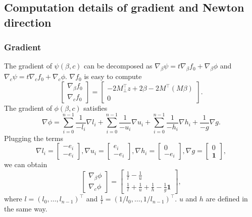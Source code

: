 \documentclass[final,onefignum,onetabnum]{siamart190516}
\begin{document}
\subsection{Computation details of gradient and Newton direction}
\subsubsection{Gradient}
The gradient of $\psi(\beta,c)$ can be decomposed as $\nabla_{\beta}\psi = t\nabla_{\beta} f_0 + \nabla_{\beta}\phi$ and $\nabla_{c}\psi = t\nabla_{c} f_0 + \nabla_{c}\phi$. $\nabla f_0$ is easy to compute
\begin{equation}
    \begin{bmatrix}
    \nabla_{\beta} f_0\\
    \nabla_{c} f_0
    \end{bmatrix} = \begin{bmatrix}-2M_{\perp}^\top z + 2\beta - 2 M^\top (M\beta)\\ 0\end{bmatrix}.
\end{equation}
The gradient of $\phi(\beta,c)$ satisfies
\begin{equation}
    \nabla \phi = \sum_{i=0}^{n-1}\frac{1}{-l_i}\nabla l_i + \sum_{i=0}^{n-1}\frac{1}{-u_i}\nabla u_i + \sum_{i=0}^{n-1}\frac{1}{-h_i}\nabla h_i + \frac{1}{-g}\nabla g.
\end{equation}
Plugging the terms
\begin{equation}
     \nabla l_i = \begin{bmatrix}-e_i\\-e_i\end{bmatrix}, 
    \nabla u_i = \begin{bmatrix}e_i\\-e_i\end{bmatrix},
    \nabla h_i = \begin{bmatrix}0\\-e_i\end{bmatrix},
    \nabla g = \begin{bmatrix}0\\\mathbf{1}\end{bmatrix},
\end{equation}
we can obtain
\begin{equation}
    \begin{bmatrix}
    \nabla_{\beta}\phi\\
    \nabla_{c}\phi
    \end{bmatrix} = \begin{bmatrix} \frac{1}{l} - \frac{1}{u} \\ \frac{1}{l} + \frac{1}{u} + \frac{1}{h} - \frac{1}{g}\mathbf{1}\end{bmatrix},
\end{equation}
where $l = (l_0,\dots,l_{n-1})^\top$ and $\frac{1}{l} = (1/l_0,\dots,1/l_{n-1})^\top$. $u$ and $h$ are defined in the same way.
\end{document}
